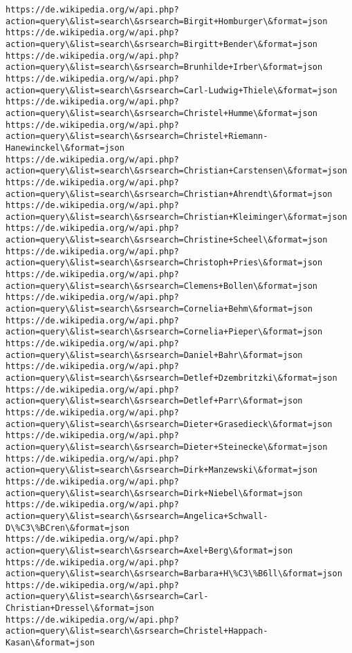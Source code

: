 \documentclass[11pt]{article}
\begin{document}
\begin{Verbatim}[commandchars=\\\{\}]
https://de.wikipedia.org/w/api.php?action=query\&list=search\&srsearch=Birgit+Homburger\&format=json
https://de.wikipedia.org/w/api.php?action=query\&list=search\&srsearch=Birgitt+Bender\&format=json
https://de.wikipedia.org/w/api.php?action=query\&list=search\&srsearch=Brunhilde+Irber\&format=json
https://de.wikipedia.org/w/api.php?action=query\&list=search\&srsearch=Carl-Ludwig+Thiele\&format=json
https://de.wikipedia.org/w/api.php?action=query\&list=search\&srsearch=Christel+Humme\&format=json
https://de.wikipedia.org/w/api.php?action=query\&list=search\&srsearch=Christel+Riemann-Hanewinckel\&format=json
https://de.wikipedia.org/w/api.php?action=query\&list=search\&srsearch=Christian+Carstensen\&format=json
https://de.wikipedia.org/w/api.php?action=query\&list=search\&srsearch=Christian+Ahrendt\&format=json
https://de.wikipedia.org/w/api.php?action=query\&list=search\&srsearch=Christian+Kleiminger\&format=json
https://de.wikipedia.org/w/api.php?action=query\&list=search\&srsearch=Christine+Scheel\&format=json
https://de.wikipedia.org/w/api.php?action=query\&list=search\&srsearch=Christoph+Pries\&format=json
https://de.wikipedia.org/w/api.php?action=query\&list=search\&srsearch=Clemens+Bollen\&format=json
https://de.wikipedia.org/w/api.php?action=query\&list=search\&srsearch=Cornelia+Behm\&format=json
https://de.wikipedia.org/w/api.php?action=query\&list=search\&srsearch=Cornelia+Pieper\&format=json
https://de.wikipedia.org/w/api.php?action=query\&list=search\&srsearch=Daniel+Bahr\&format=json
https://de.wikipedia.org/w/api.php?action=query\&list=search\&srsearch=Detlef+Dzembritzki\&format=json
https://de.wikipedia.org/w/api.php?action=query\&list=search\&srsearch=Detlef+Parr\&format=json
https://de.wikipedia.org/w/api.php?action=query\&list=search\&srsearch=Dieter+Grasedieck\&format=json
https://de.wikipedia.org/w/api.php?action=query\&list=search\&srsearch=Dieter+Steinecke\&format=json
https://de.wikipedia.org/w/api.php?action=query\&list=search\&srsearch=Dirk+Manzewski\&format=json
https://de.wikipedia.org/w/api.php?action=query\&list=search\&srsearch=Dirk+Niebel\&format=json
https://de.wikipedia.org/w/api.php?action=query\&list=search\&srsearch=Angelica+Schwall-D\%C3\%BCren\&format=json
https://de.wikipedia.org/w/api.php?action=query\&list=search\&srsearch=Axel+Berg\&format=json
https://de.wikipedia.org/w/api.php?action=query\&list=search\&srsearch=Barbara+H\%C3\%B6ll\&format=json
https://de.wikipedia.org/w/api.php?action=query\&list=search\&srsearch=Carl-Christian+Dressel\&format=json
https://de.wikipedia.org/w/api.php?action=query\&list=search\&srsearch=Christel+Happach-Kasan\&format=json

\end{Verbatim}
\end{document}
